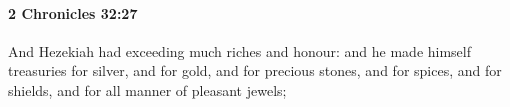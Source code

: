 
		\paragraph{2 Chronicles 32:27} %
			\label{2CHRONICLES-32-27}

			And Hezekiah had exceeding much riches and honour: and he made himself treasuries for silver, and for gold, and for precious stones, and for spices, and for shields, and for all manner of pleasant jewels;


